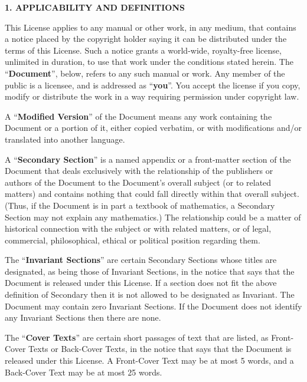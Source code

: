 \begin{center}
{\Large\bf 1. APPLICABILITY AND DEFINITIONS\par}
\end{center}

This License applies to any manual or other work, in any medium, that
contains a notice placed by the copyright holder saying it can be
distributed under the terms of this License.  Such a notice grants a
world-wide, royalty-free license, unlimited in duration, to use that
work under the conditions stated herein.  The ``\textbf{Document}'', below,
refers to any such manual or work.  Any member of the public is a
licensee, and is addressed as ``\textbf{you}''.  You accept the license if you
copy, modify or distribute the work in a way requiring permission
under copyright law.

A ``\textbf{Modified Version}'' of the Document means any work containing the
Document or a portion of it, either copied verbatim, or with
modifications and/or translated into another language.

A ``\textbf{Secondary Section}'' is a named appendix or a front-matter section of
the Document that deals exclusively with the relationship of the
publishers or authors of the Document to the Document's overall subject
(or to related matters) and contains nothing that could fall directly
within that overall subject.  (Thus, if the Document is in part a
textbook of mathematics, a Secondary Section may not explain any
mathematics.)  The relationship could be a matter of historical
connection with the subject or with related matters, or of legal,
commercial, philosophical, ethical or political position regarding
them.

The ``\textbf{Invariant Sections}'' are certain Secondary Sections whose titles
are designated, as being those of Invariant Sections, in the notice
that says that the Document is released under this License.  If a
section does not fit the above definition of Secondary then it is not
allowed to be designated as Invariant.  The Document may contain zero
Invariant Sections.  If the Document does not identify any Invariant
Sections then there are none.

The ``\textbf{Cover Texts}'' are certain short passages of text that are listed,
as Front-Cover Texts or Back-Cover Texts, in the notice that says that
the Document is released under this License.  A Front-Cover Text may
be at most 5 words, and a Back-Cover Text may be at most 25 words.

